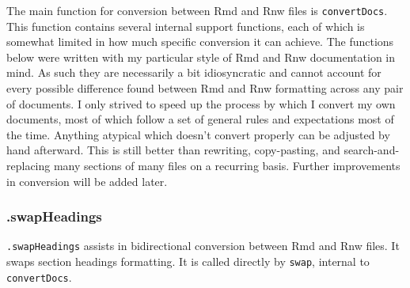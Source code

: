 \documentclass{article}\usepackage[]{graphicx}\usepackage[]{color}
\begin{document}
The main function for conversion between Rmd and Rnw files is \texttt{convertDocs}.
This function contains several internal support functions, each of which is somewhat limited in how much specific conversion it can achieve.
The functions below were written with my particular style of Rmd and Rnw documentation in mind.
As such they are necessarily a bit idiosyncratic and cannot account for every possible difference found between Rmd and Rnw formatting across any pair of documents.
I only strived to speed up the process by which I convert my own documents, most of which follow a set of general rules and expectations most of the time.
Anything atypical which doesn't convert properly can be adjusted by hand afterward.
This is still better than rewriting, copy-pasting, and search-and-replacing many sections of many files on a recurring basis.
Further improvements in conversion will be added later.

\subsubsection{.swapHeadings}
\texttt{.swapHeadings} assists in bidirectional conversion between Rmd and Rnw files.
It swaps section headings formatting.
It is called directly by \texttt{swap}, internal to \texttt{convertDocs}.
\end{document}
